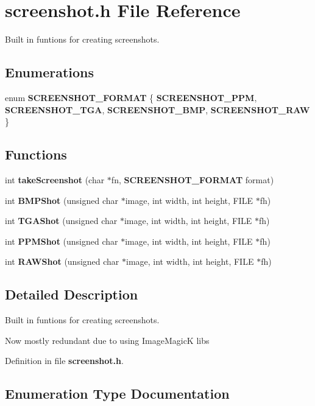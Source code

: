 \section{screenshot.h File Reference}
\label{screenshot_8h}
Built in funtions for creating screenshots.  


\subsection*{Enumerations}
\begin{CompactItemize}
\item 
enum {\bf SCREENSHOT\_\-FORMAT} \{ {\bf SCREENSHOT\_\-PPM}, 
{\bf SCREENSHOT\_\-TGA}, 
{\bf SCREENSHOT\_\-BMP}, 
{\bf SCREENSHOT\_\-RAW}
 \}
\end{CompactItemize}
\subsection*{Functions}
\begin{CompactItemize}
\item 
int {\bf take\-Screenshot} (char $\ast$fn, {\bf SCREENSHOT\_\-FORMAT} format)
\item 
int {\bf BMPShot} (unsigned char $\ast$image, int width, int height, FILE $\ast$fh)
\item 
int {\bf TGAShot} (unsigned char $\ast$image, int width, int height, FILE $\ast$fh)
\item 
int {\bf PPMShot} (unsigned char $\ast$image, int width, int height, FILE $\ast$fh)
\item 
int {\bf RAWShot} (unsigned char $\ast$image, int width, int height, FILE $\ast$fh)
\end{CompactItemize}


\subsection{Detailed Description}
Built in funtions for creating screenshots. 

Now mostly redundant due to using Image\-Magic\-K libs

Definition in file {\bf screenshot.h}.

\subsection{Enumeration Type Documentation}

